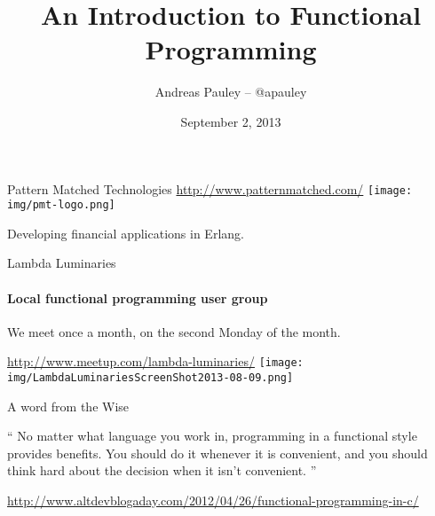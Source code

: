 \documentclass{beamer}
\title[Functional Programming]{An Introduction to Functional Programming}
\author{Andreas Pauley -- @apauley}
\institute{Pattern Matched Technologies\\Lambda Luminaries}
\date{September 2, 2013}
\begin{document}
\begin{frame}
\titlepage
\end{frame}

\begin{frame}{Pattern Matched Technologies}
\url{http://www.patternmatched.com/}
\texttt{[image: img/pmt-logo.png]}

Developing financial applications in Erlang.
\end{frame}

\begin{frame}{Lambda Luminaries}
\framesubtitle{Local functional programming user group}
We meet once a month, on the second Monday of the month.

\url{http://www.meetup.com/lambda-luminaries/}
\texttt{[image: img/LambdaLuminariesScreenShot2013-08-09.png]}

\end{frame}

\begin{frame}{A word from the Wise}

\begin{exampleblock}{}
  {\large ``
No matter what language you work in, programming
in a functional style provides benefits.
You should do it whenever it is convenient, and you
should think hard about the decision when it isn’t convenient.
  ''}
  \vskip5mm
  \hspace*{}
\end{exampleblock}


\url{http://www.altdevblogaday.com/2012/04/26/functional-programming-in-c/}

\end{frame}
\end{document}

